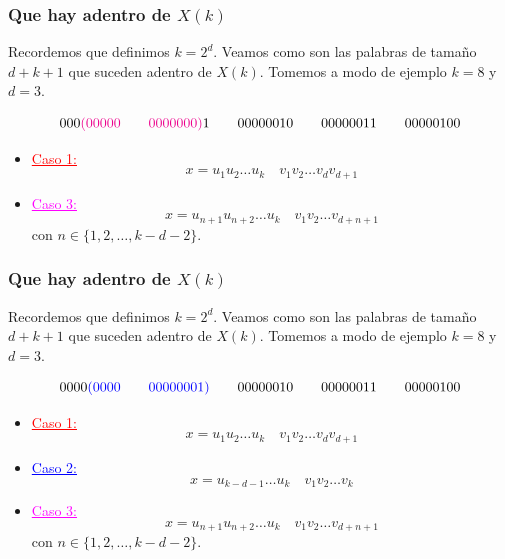 \documentclass[10pt,mathserif]{beamer}%
\begin{document}
\begin{frame}
  \frametitle{Que hay adentro de $X(k)$}
  Recordemos que definimos $k = 2^d$.
  Veamos como son las palabras de tamaño $d + k + 1$ que suceden adentro de $X(k)$. Tomemos a modo de ejemplo $k = 8$ y $d = 3$.

  $$000\textcolor{magenta}{(00000 \qquad 0000000)} 1 \qquad 00000010 \qquad 00000011 \qquad 00000100$$

    \begin{itemize}
    \item \textcolor{red}{\underline{Caso 1:}}
    $$x = u_1 u_2 \dots u_k \quad v_1 v_2 \dots v_{d} v_{d + 1}$$  
    \par
    \item \textcolor{magenta}{\underline{Caso 3:}}
    $$x = u_{n+1} u_{n+2} \dots u_k \quad  v_1 v_2 \dots v_{d+n+1} $$
    con $n \in \{1,2,\dots ,k - d - 2\}$.
    \par
  \end{itemize}
\end{frame}

\begin{frame}
  \frametitle{Que hay adentro de $X(k)$}
  Recordemos que definimos $k = 2^d$.
  Veamos como son las palabras de tamaño $d + k + 1$ que suceden adentro de $X(k)$. Tomemos a modo de ejemplo $k = 8$ y $d = 3$.

  $$0000\textcolor{blue}{(0000 \qquad 00000001)}  \qquad 00000010 \qquad 00000011 \qquad 00000100$$

    \begin{itemize}
    \item \textcolor{red}{\underline{Caso 1:}}
    $$x = u_1 u_2 \dots u_k \quad v_1 v_2 \dots v_{d} v_{d + 1}$$  
    \item \textcolor{blue}{\underline{Caso 2:}}
    $$ x = u_{k-d-1} \dots u_k \quad v_1 v_2 \dots v_k$$
    \item \textcolor{magenta}{\underline{Caso 3:}}
    $$x = u_{n+1} u_{n+2} \dots u_k \quad  v_1 v_2 \dots v_{d+n+1} $$
    con $n \in \{1,2,\dots ,k - d - 2\}$.
    \par
  \end{itemize}
\end{frame}
\end{document}
